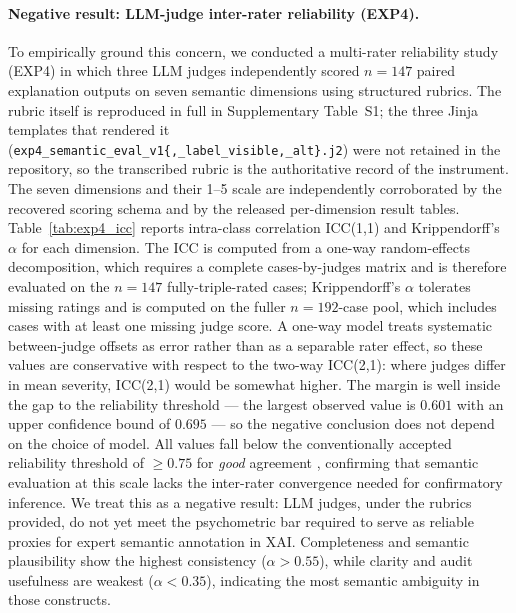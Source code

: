\documentclass[twoside,11pt]{article}
\begin{document}
\paragraph{Negative result: LLM-judge inter-rater reliability (EXP4).}
To empirically ground this concern, we conducted a multi-rater reliability
study (EXP4) in which three LLM judges independently scored $n=147$ paired
explanation outputs on seven semantic dimensions using structured rubrics.
The rubric itself is reproduced in full in Supplementary Table~S1; the three
Jinja templates that rendered it
(\texttt{exp4\_semantic\_eval\_v1\{,\_label\_visible,\_alt\}.j2}) were not
retained in the repository, so the transcribed rubric is the authoritative
record of the instrument. The seven dimensions and their 1--5 scale are
independently corroborated by the recovered scoring schema and by the released
per-dimension result tables.
Table~\ref{tab:exp4_icc} reports intra-class correlation ICC(1,1) and
Krippendorff's $\alpha$ for each dimension. The ICC is computed from a
one-way random-effects decomposition, which requires a complete
cases-by-judges matrix and is therefore evaluated on the $n=147$
fully-triple-rated cases; Krippendorff's $\alpha$ tolerates missing ratings
and is computed on the fuller $n=192$-case pool, which includes cases with
at least one missing judge score. A one-way model treats systematic
between-judge offsets as error rather than as a separable rater effect, so
these values are conservative with respect to the two-way ICC(2,1): where
judges differ in mean severity, ICC(2,1) would be somewhat higher. The
margin is well inside the gap to the reliability threshold --- the largest
observed value is $0.601$ with an upper confidence bound of $0.695$ ---
so the negative conclusion does not depend on the choice of model. All values fall below the
conventionally accepted reliability threshold of $\geq 0.75$ for
\emph{good} agreement \citep{koo2016guideline}, confirming that semantic
evaluation at this scale lacks the inter-rater convergence needed for
confirmatory inference. We treat this as a negative result: LLM judges,
under the rubrics provided, do not yet meet the psychometric bar required
to serve as reliable proxies for expert semantic annotation in XAI.
Completeness and semantic plausibility show the highest consistency
($\alpha > 0.55$), while clarity and audit usefulness are weakest
($\alpha < 0.35$), indicating the most semantic ambiguity in those constructs.
\end{document}

